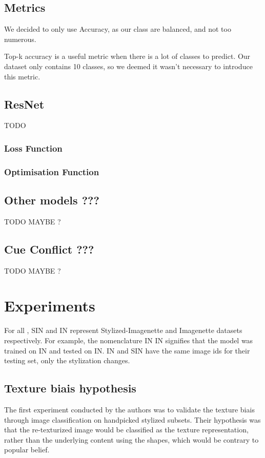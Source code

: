 \documentclass{article}
\begin{document}
\subsection{Metrics}

We decided to only use Accuracy, as our class are balanced, and not too numerous.

Top-k accuracy is a useful metric when there is a lot of classes to predict. Our dataset only
contains 10 classes, so we deemed it wasn't necessary to introduce this metric.

\subsection{ResNet}

TODO

\subsubsection{Loss Function}

\subsubsection{Optimisation Function}


\subsection{Other models ???}

TODO MAYBE ?

\subsection{Cue Conflict ???}

TODO MAYBE ?

\newpage
\section{Experiments}

For all , SIN and IN represent Stylized-Imagenette and Imagenette datasets respectively.
For example, the nomenclature IN \texorpdfstring{\textrightarrow} .IN signifies that the 
model was trained on IN and tested on IN.
IN and SIN have the same image ids for their testing set, only the stylization changes.

\subsection{Texture biais hypothesis}
The first experiment conducted by the authors was to validate the texture biais 
through image classification on handpicked stylized subsets. 
Their hypothesis was that the re-texturized image would be classified as the texture representation, rather than 
the underlying content using the shapes, which would be contrary to popular belief. \smallskip
\end{document}
